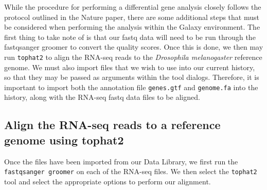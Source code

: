 \documentclass[a4paper,10pt]{article}
\begin{document}
While the procedure for performing a differential gene analysis closely follows the protocol outlined in the Nature paper, there are some additional steps that must be considered when performing the analysis within the Galaxy environment.  The first thing to take note of is that our fastq data will need to be run through the fastqsanger groomer to convert the quality scores.  Once this is done, we then may run \texttt{\footnotesize{tophat2}}\cite{tophat2} to align the RNA-seq reads to the \textit{Drosophila melanogaster} reference genome.  We must also import files that we wish to use into our current history, so that they may be passed as arguments within the tool dialogs.  Therefore, it is important to import both the annotation file \texttt{\footnotesize{genes.gtf}} and \texttt{\footnotesize{genome.fa}} into the history, along with the RNA-seq fastq data files to be aligned.

\subsection{Align the RNA-seq reads to a reference genome using tophat2}
Once the files have been imported from our Data Library, we first run the \texttt{\footnotesize{fastqsanger groomer}} on each of the RNA-seq files.  We then select the \texttt{\footnotesize{tophat2}} tool and select the appropriate options to perform our alignment.
\end{document}
